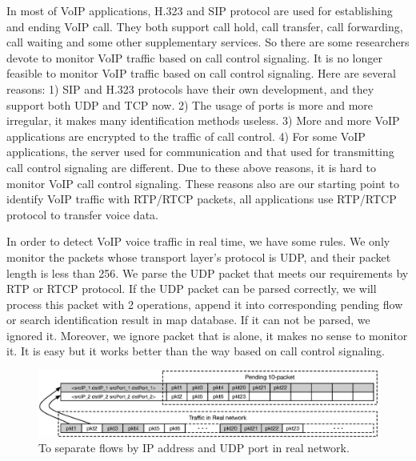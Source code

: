 \documentclass[conference]{IEEEtran}
\begin{document}
In most of VoIP applications, H.323 and SIP protocol are used for establishing and ending VoIP call. They both support call hold, call transfer, call forwarding, call waiting and some other supplementary services. So there are some researchers devote to monitor VoIP traffic based on call control signaling. It is no longer feasible to monitor VoIP traffic based on call control signaling. Here are several reasons: 1) SIP and H.323 protocols have their own development, and they support both UDP and TCP now. 2) The usage of ports is more and more irregular, it makes many identification methods useless. 3) More and more VoIP applications are encrypted to the traffic of call control. 4) For some VoIP applications, the server used for communication and that used for transmitting call control signaling are different. Due to these above reasons, it is hard to monitor VoIP call control signaling. These reasons also are our starting point to identify VoIP traffic with RTP/RTCP packets, all applications use RTP/RTCP protocol to transfer voice data.

In order to detect VoIP voice traffic in real time, we have some rules. We only monitor the packets whose transport layer's protocol is UDP, and their packet length is less than 256. We parse the UDP packet that meets our requirements by RTP or RTCP protocol. If the UDP packet can be parsed correctly, we will process this packet with 2 operations, append it into corresponding pending flow or search identification result in map database. If it can not be parsed, we ignored it. Moreover, we ignore packet that is alone, it makes no sense to monitor it. It is easy but it works better than the way based on call control signaling.

\begin{figure}[htp]
\begin{center}
\includegraphics[width=1.0\textwidth]{flow.eps}
\caption{To separate flows by IP address and UDP port in real network.}\label{fig:flow}
\end{center}
\end{figure}
\end{document}
